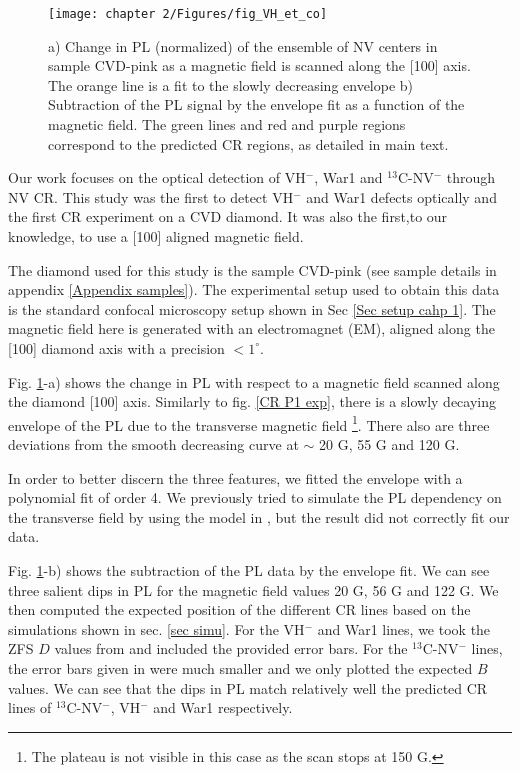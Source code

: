 \documentclass[a4paper, 11pt]{report}
\begin{document}
\begin{figure}[h]
\centering
\texttt{[image: chapter 2/Figures/fig\_VH\_et\_co]}
\caption{a) Change in PL (normalized) of the ensemble of NV centers in sample CVD-pink as a magnetic field is scanned along the [100] axis. The orange line is a fit to the slowly decreasing envelope b) Subtraction of the PL signal by the envelope fit as a function of the magnetic field. The green lines and red and purple regions correspond to the predicted CR regions, as detailed in main text.}
\label{CR VH exp}
\end{figure}

Our work \citep{pellet2021optical} focuses on the optical detection of VH$^-$, War1 and $^{13}$C-NV$^-$ through NV CR. This study was the first to detect VH$^-$ and War1 defects optically and the first CR experiment on a CVD diamond. It was also the first,to our knowledge, to use a [100] aligned magnetic field.

The diamond used for this study is the sample CVD-pink (see sample details in appendix \ref{Appendix samples}). The experimental setup used to obtain this data is the standard confocal microscopy setup shown in Sec \ref{Sec setup cahp 1}. The magnetic field here is generated with an electromagnet (EM), aligned along the [100] diamond axis with a precision $<1^\circ$. 

Fig. \ref{CR VH exp}-a) shows the change in PL with respect to a magnetic field scanned along the diamond [100] axis. Similarly to fig. \ref{CR P1 exp}, there is a slowly decaying envelope of the PL due to the transverse magnetic field \footnote{The plateau is not visible in this case as the scan stops at 150 G.}. There also are three deviations from the smooth decreasing curve at $\sim$ 20 G, 55 G and 120 G.

In order to better discern the three features, we fitted the envelope with a polynomial fit of order 4. We previously tried to simulate the PL dependency on the transverse field by using the model in \citep{tetienne2012magnetic}, but the result did not correctly fit our data.

Fig. \ref{CR VH exp}-b) shows the subtraction of the PL data by the envelope fit. We can see three salient dips in PL for the magnetic field values 20 G, 56 G and 122 G. We then computed the expected position of the different CR lines based on the simulations shown in sec. \ref{sec simu}. For the VH$^-$ and War1 lines, we took the ZFS $D$ values from \citep{cruddace2007magnetic} and included the provided error bars. For the $^{13}$C-NV$^-$ lines, the error bars given in \citep{simanovskaia2013sidebands} were much smaller and we only plotted the expected $B$ values. We can see that the dips in PL match relatively well the predicted CR lines of $^{13}$C-NV$^-$, VH$^-$ and War1 respectively.
\end{document}
